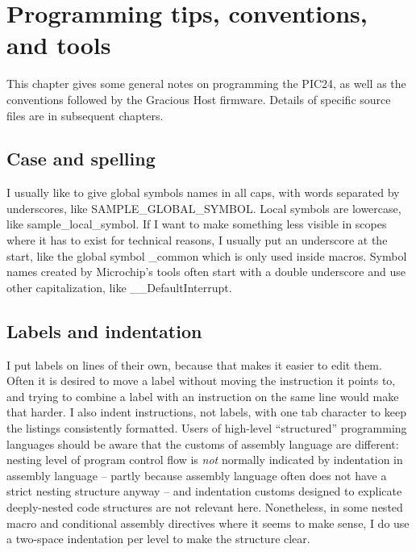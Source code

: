 
%
%
%
%
%
%

\chapter{Programming tips, conventions, and tools}

This chapter gives some general notes on programming the PIC24, as well as
the conventions followed by the Gracious Host firmware.  Details of specific
source files are in subsequent chapters.

\section{Case and spelling}

I usually like to give global symbols names in all caps, with words
separated by underscores, like SAMPLE\_GLOBAL\_SYMBOL.  Local symbols are
lowercase, like sample\_local\_symbol.  If I want to make something less
visible in scopes where it has to exist for technical reasons, I usually put
an underscore at the start, like the global symbol \_common which is only
used inside macros.  Symbol names created by Microchip's tools often start
with a double underscore and use other capitalization, like
\_\_DefaultInterrupt.

\section{Labels and indentation}

I put labels on lines of their own, because that makes it easier to edit
them.  Often it is desired to move a label without moving the instruction it
points to, and trying to combine a label with an instruction on the same
line would make that harder.  I also indent instructions, not labels, with
one tab character to keep the listings consistently formatted.  Users of
high-level ``structured'' programming languages should be aware that the
customs of assembly language are different: nesting level of program control
flow is \emph{not} normally indicated by indentation in assembly language --
partly because assembly language often does not have a strict nesting
structure anyway -- and indentation customs designed to explicate
deeply-nested code structures are not relevant here.  Nonetheless, in some
nested macro and conditional assembly directives where it seems to make
sense, I do use a two-space indentation per level to make the structure
clear.

